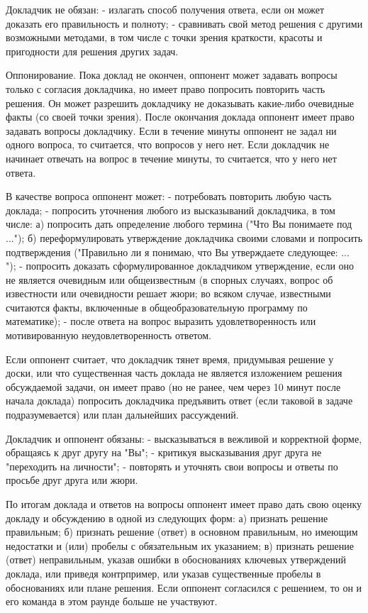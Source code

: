 \documentclass{article}
\begin{document}
Докладчик не обязан: 
- излагать способ получения ответа, если он может доказать его правильность и полноту; 
- сравнивать свой метод решения с другими возможными методами, в том числе с точки зрения краткости, красоты и пригодности для решения других задач.

Оппонирование. Пока доклад не окончен, оппонент может задавать вопросы только с согласия докладчика, но имеет право попросить повторить часть решения. Он может разрешить докладчику не доказывать какие-либо очевидные факты (со своей точки зрения). После окончания доклада оппонент имеет право задавать вопросы докладчику. Если в течение минуты оппонент не задал ни одного вопроса, то считается, что вопросов у него нет. Если докладчик не начинает отвечать на вопрос в течение минуты, то считается, что у него нет ответа.

В качестве вопроса оппонент может: 
- потребовать повторить любую часть доклада; 
- попросить уточнения любого из высказываний докладчика, в том числе: а) попросить дать определение любого термина ("Что Вы понимаете под ..."); б) переформулировать утверждение докладчика своими словами и попросить подтверждения ("Правильно ли я понимаю, что Вы утверждаете следующее: ... "); 
- попросить доказать сформулированное докладчиком утверждение, если оно не является очевидным или общеизвестным (в спорных случаях, вопрос об известности или очевидности решает жюри; во всяком случае, известными считаются факты, включенные в общеобразовательную программу по математике); 
- после ответа на вопрос выразить удовлетворенность или мотивированную неудовлетворенность ответом.

Если оппонент считает, что докладчик тянет время, придумывая решение у доски, или что существенная часть доклада не является изложением решения обсуждаемой задачи, он имеет право (но не ранее, чем через 10 минут после начала доклада) попросить докладчика предъявить ответ (если таковой в задаче подразумевается) или план дальнейших рассуждений.

Докладчик и оппонент обязаны: 
- высказываться в вежливой и корректной форме, обращаясь к друг другу на "Вы"; 
- критикуя высказывания друг друга не "переходить на личности"; 
- повторять и уточнять свои вопросы и ответы по просьбе друг друга или жюри.

По итогам доклада и ответов на вопросы оппонент имеет право дать свою оценку докладу и обсуждению в одной из следующих форм: а) признать решение правильным; б) признать решение (ответ) в основном правильным, но имеющим недостатки и (или) пробелы с обязательным их указанием; в) признать решение (ответ) неправильным, указав ошибки в обоснованиях ключевых утверждений доклада, или приведя контрпример, или указав существенные пробелы в обоснованиях или плане решения. Если оппонент согласился с решением, то он и его команда в этом раунде больше не участвуют.
\end{document}
